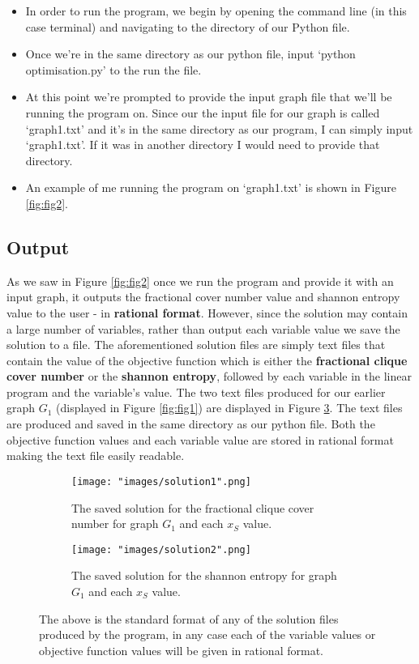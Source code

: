 \documentclass[12pt, a4paper]{article}
\begin{document}
\begin{itemize}[label=\raisebox{0.25ex}{\tiny$\bullet$}]
\itemsep0em
\item In order to run the program, we begin by opening the command line (in this case terminal) and navigating to the directory of our Python file.
\item Once we're in the same directory as our python file, input `python optimisation.py' to the run the file.
\item At this point we're prompted to provide the input graph file that we'll be running the program on. Since our the input file for our graph is called `graph1.txt' and it's in the same directory as our program, I can simply input `graph1.txt'. If it was in another directory I would need to provide that directory.
\item An example of me running the program on `graph1.txt' is shown in Figure \ref{fig:fig2}.
\end{itemize}


\subsection*{Output}
As we saw in Figure \ref{fig:fig2} once we run the program and provide it with an input graph, it outputs the fractional cover number value and shannon entropy value to the user - in \textbf{rational format}. However, since the solution may contain a large number of variables, rather than output each variable value we save the solution to a file. The aforementioned solution files are simply text files that contain the value of the objective function which is either the \textbf{fractional clique cover number} or the \textbf{shannon entropy}, followed by each variable in the linear program and the variable's value. The two text files produced for our earlier graph $G_1$ (displayed in Figure \ref{fig:fig1}) are displayed in Figure \ref{fig:fig4}. The text files are produced and saved in the same directory as our python file. Both the objective function values and each variable value are stored in rational format making the text file easily readable.

\begin{figure}[!htb]
\centering
\begin{subfigure}{.45\textwidth}
  \centering
  \texttt{[image: "images/solution1".png]}
  \caption*{The saved solution for the fractional clique cover number for graph $G_1$ and each $x_S$ value.}
  \label{fig:sub3}
\end{subfigure}\hfill
\begin{subfigure}{.45\textwidth}
  \centering
  \texttt{[image: "images/solution2".png]}
  \caption*{The saved solution for the shannon entropy for graph $G_1$ and each $x_S$ value.}
  \label{fig:sub4}
\end{subfigure}
\caption{The above is the standard format of any of the solution files produced by the program, in any case each of the variable values or objective function values will be given in rational format.}
\label{fig:fig4}
\end{figure}
\end{document}
